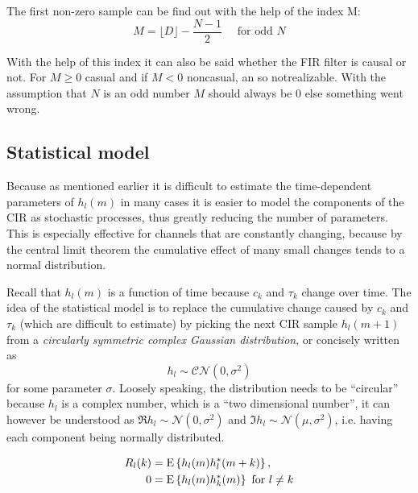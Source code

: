 The first non-zero sample can be find out with the help of the index M:
\begin{equation}\label{eqn: M first non-zero sample}
	M = \lfloor D\rfloor-\frac{N-1}{2} \quad \text { for odd } N
\end{equation}

With the help of this index it can also be said whether the FIR filter is causal or not. For \(M \geq 0\) casual and if  \(M < 0\) noncasual, an so notrealizable. With the assumption that \(N\) is an odd number \(M \) should always be \( 0\) else something went wrong.





\subsection{Statistical model} \label{sec:statistical-model}

Because as mentioned earlier it is difficult to estimate the time-dependent parameters of \(h_l(m)\) in many cases it is easier to model the components of the CIR as stochastic processes, thus greatly reducing the number of parameters. This is especially effective for channels that are constantly changing, because by the central limit theorem the cumulative effect of many small changes tends to a normal distribution.

Recall that \(h_l(m)\) is a function of time because \(c_k\) and \(\tau_k\) change over time. The idea of the statistical model is to replace the cumulative change caused by \(c_k\) and \(\tau_k\) (which are difficult to estimate) by picking the next CIR sample \(h_l(m +1)\) from a \emph{circularly symmetric complex Gaussian distribution}, or concisely written as
\begin{equation}
	h_l \sim \mathcal{CN}(0, \sigma^2)
\end{equation} 
for some parameter \(\sigma\). Loosely speaking, the distribution needs to be ``circular'' because \(h_l\) is a complex number, which is a ``two dimensional number'', it can however be understood as \(\Re{h_l} \sim \mathcal{N}(0, \sigma^2)\) and \(\Im{h_l} \sim \mathcal{N}(\mu, \sigma^2)\), i.e. having each component being normally distributed.


\begin{subequations}
	\begin{align}
		R_{l} (k) &= \operatorname{E} \left\{h_l(m) h_l^*(m+k)\right\}, \\
		0 &= \operatorname{E} \left\{h_l(m) h_k^*(m)\right\} \text { for } l \neq k
	\end{align}
\end{subequations}

